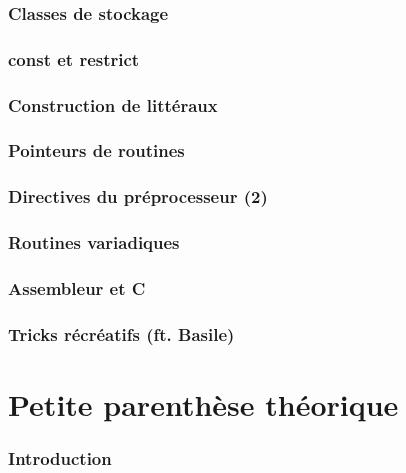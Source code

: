 \documentclass{minitelreport}
\begin{document}
\begin{refsection}
		\section{Classes de stockage}
			\label{sec:classes_de_stockage}
			
		\section{const et restrict}
			\label{sec:const_et_restrict}
			
		\section{Construction de littéraux}
			\label{sec:construction_de_litt_raux}
			
		\section{Pointeurs de routines}
			\label{sec:pointeurs_de_routines}
			
		\section{Directives du préprocesseur (2)}
			\label{sec:directives_de_pr_processeurs_2_}
			
		\section{Routines variadiques}
			\label{sec:routines_variadiques}
			
		\section{Assembleur et C}
			\label{sec:assembleur_et_c}
			
		\section{Tricks récréatifs (ft. Basile)}
			\label{sec:tricks_r_cr_atifs_ft_basile_}
			
\part{Petite parenthèse théorique}
\label{part:petite_parenthèse_théorique}
	\section*{Introduction}
	

\end{refsection}
\end{document}

